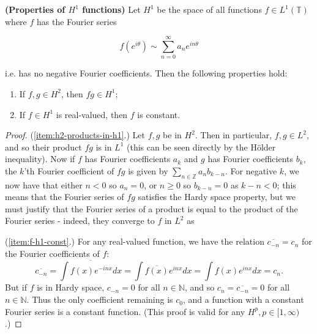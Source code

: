 \documentclass[../main.tex]{subfiles}
\begin{document}
\begin{lemma}{\textbf{(Properties of $H^1$ functions)}}\label{thm:h1-properties}
Let $H^1$ be the space of all functions $f \in L^1(\mathbb{T})$ where $f$ has the Fourier series

$$f(e^{i \theta}) \sim \sum_{n=0}^\infty a_n e^{i n \theta}$$

i.e. has no negative Fourier coefficients. Then the following properties hold:
\begin{enumerate}
\item\label{item:h2-products-in-h1} If $f, g \in H^2$, then $fg \in H^1$;
\item\label{item:f-h1-const} If $f \in H^1$ is real-valued, then $f$ is constant.
\end{enumerate}
\end{lemma}
\begin{proof}
(\ref{item:h2-products-in-h1}.) Let $f, g$ be in $H^2$. Then in particular, $f, g \in L^2$, and so their product $fg$ is in $L^1$ (this can be seen directly by the H\"older inequality). Now if $f$ has Fourier coefficients $a_k$ and $g$ has Fourier coefficients $b_k$, the $k$'th Fourier coefficient of $fg$ is given by $\sum_{n \in \mathbb{Z}} a_n b_{k-n}$. For negative $k$, we now have that either $n < 0$ so $a_n = 0$, or $n \geq 0$ so $b_{k-n} = 0$ as $k-n < 0$;
this means that the Fourier series of $fg$ satisfies the Hardy space property, but we must justify that the Fourier series of a product is equal to the product of the Fourier series - indeed, they converge to $f$ in $L^2$ as 

(\ref{item:f-h1-const}.) For any real-valued function, we have the relation $\overline{c_{-n}} = c_n$ for the Fourier coefficients of $f$:
$$ \overline{c_{-n}} = \overline{\int f(x) e^{-inx} dx} = \int \overline{f(x)} e^{inx} dx = \int f(x) e^{inx} dx = c_n.$$
But if $f$ is in Hardy space, $c_{-n} = 0$ for all $n \in \mathbb{N}$, and so $c_n = \overline{c_{-n}} = 0$ for all $n \in \mathbb{N}$. Thus
the only coefficient remaining is $c_0$, and a function with a constant Fourier series is a constant function. (This proof is valid for any $H^p, p \in [1, \infty)$.)
\end{proof}
\end{document}
